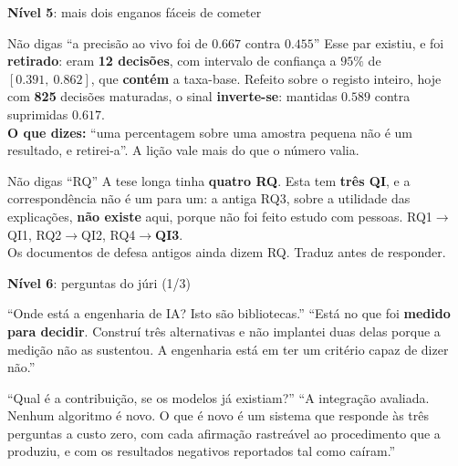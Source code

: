 \documentclass[aspectratio=169]{beamer}
\newcommand{\key}[1]{\textbf{\textcolor{blue!55!black}{#1}}}
\begin{document}
\begin{frame}{\key{Nível 5}: mais dois enganos fáceis de cometer}
\begin{block}{Não digas ``a precisão ao vivo foi de $0.667$ contra $0.455$''}
Esse par existiu, e foi \textbf{retirado}: eram \textbf{12 decisões}, com intervalo de
confiança a $95\%$ de $[0.391,\ 0.862]$, que \textbf{contém} a taxa-base. Refeito sobre o
registo inteiro, hoje com \textbf{825} decisões maturadas, o sinal \textbf{inverte-se}:
mantidas $0.589$ contra suprimidas $0.617$.\\[2mm]
\textbf{O que dizes:} ``uma percentagem sobre uma amostra pequena não é um resultado, e
retirei-a''. A lição vale mais do que o número valia.
\end{block}
\vspace{2mm}
\begin{block}{Não digas ``RQ''}
A tese longa tinha \textbf{quatro RQ}. Esta tem \textbf{três QI}, e a correspondência não é um
para um: a antiga RQ3, sobre a utilidade das explicações, \textbf{não existe} aqui, porque não
foi feito estudo com pessoas. RQ1$\to$QI1, RQ2$\to$QI2, RQ4$\to$\textbf{QI3}.\\[2mm]
Os documentos de defesa antigos ainda dizem RQ. Traduz antes de responder.
\end{block}
\end{frame}

\begin{frame}{\key{Nível 6}: perguntas do júri (1/3)}
\small
\begin{block}{``Onde está a engenharia de IA? Isto são bibliotecas.''}
``Está no que foi \textbf{medido para decidir}. Construí três alternativas e não implantei duas
delas porque a medição não as sustentou. A engenharia está em ter um critério capaz de dizer não.''
\end{block}
\begin{block}{``Qual é a contribuição, se os modelos já existiam?''}
``A integração avaliada. Nenhum algoritmo é novo. O que é novo é um sistema que responde às três
perguntas a custo zero, com cada afirmação rastreável ao procedimento que a produziu, e com os
resultados negativos reportados tal como caíram.''
\end{block}
\end{frame}
\end{document}

